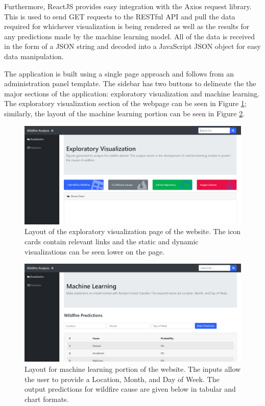\documentclass[conference]{IEEEtran}
\begin{document}
Furthermore, ReactJS provides easy integration with the Axios request library. This is used to send GET requests to the RESTful API and pull the data required for whichever visualization is being rendered as well as the results for any predictions made by the machine learning model. All of the data is received in the form of a JSON string and decoded into a JavaScript JSON object for easy data manipulation. \par

The application is built using a single page approach and follows from an administration panel template. The sidebar has two buttons to delineate the the major sections of the application: exploratory visualization and machine learning. The exploratory visualization section of the webpage can be seen in Figure \ref{fig:web_layout_visualization}; similarly, the layout of the machine learning portion can be seen in Figure \ref{fig:web_layout_ml}. \par

\begin{figure}
    \centering
    \includegraphics[scale=0.2]{img/web_layout_visualization.PNG}
    \caption{Layout of the exploratory visualization page of the website. The icon cards contain relevant links and the static and dynamic visualizations can be seen lower on the page.}
    \label{fig:web_layout_visualization}
\end{figure}

\begin{figure}
    \centering
    \includegraphics[scale=0.2]{img/web_layout_ml.PNG}
    \caption{Layout for machine learning portion of the website. The inputs allow the user to provide a Location, Month, and Day of Week. The output predictions for wildfire cause are given below in tabular and chart formats.}
    \label{fig:web_layout_ml}
\end{figure}
\end{document}
